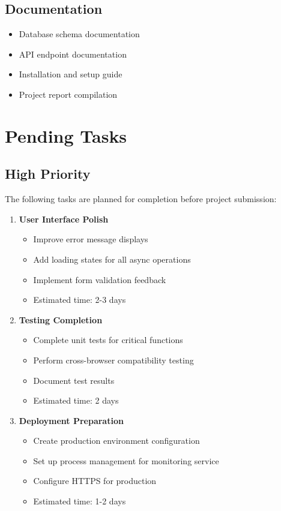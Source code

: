 \subsection{Documentation}
\begin{itemize}
    \item[\checkmark] Database schema documentation
    \item[\checkmark] API endpoint documentation
    \item[\checkmark] Installation and setup guide
    \item[\checkmark] Project report compilation
\end{itemize}

\section{Pending Tasks}

\subsection{High Priority}
The following tasks are planned for completion before project submission:

\begin{enumerate}
    \item \textbf{User Interface Polish}
    \begin{itemize}
        \item Improve error message displays
        \item Add loading states for all async operations
        \item Implement form validation feedback
        \item Estimated time: 2-3 days
    \end{itemize}
    
    \item \textbf{Testing Completion}
    \begin{itemize}
        \item Complete unit tests for critical functions
        \item Perform cross-browser compatibility testing
        \item Document test results
        \item Estimated time: 2 days
    \end{itemize}
    
    \item \textbf{Deployment Preparation}
    \begin{itemize}
        \item Create production environment configuration
        \item Set up process management for monitoring service
        \item Configure HTTPS for production
        \item Estimated time: 1-2 days
    \end{itemize}
\end{enumerate}

